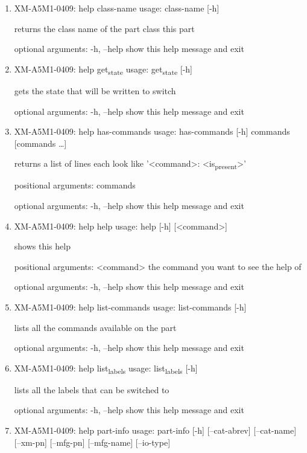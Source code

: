 \documentclass[11pt]{article}
\begin{document}
\begin{enumerate}
\item XM-A5M1-0409: help class-name
\label{sec:org9bf5bab}
usage: class-name [-h]

returns the class name of the part class this part

optional arguments:
  -h, --help  show this help message and exit

\item XM-A5M1-0409: help get\textsubscript{state}
\label{sec:org80c247e}
usage: get\textsubscript{state} [-h]

gets the state that will be written to switch

optional arguments:
  -h, --help  show this help message and exit

\item XM-A5M1-0409: help has-commands
\label{sec:org0997cf5}
usage: has-commands [-h] commands [commands \ldots{}]

returns a list of lines each look like '<command>: <is\textsubscript{present}>'

positional arguments:
  commands

optional arguments:
  -h, --help  show this help message and exit

\item XM-A5M1-0409: help help
\label{sec:org4e8efb1}
usage: help [-h] [<command>]

shows this help

positional arguments:
  <command>   the command you want to see the help of

optional arguments:
  -h, --help  show this help message and exit

\item XM-A5M1-0409: help list-commands
\label{sec:orgd54fe09}
usage: list-commands [-h]

lists all the commands available on the part

optional arguments:
  -h, --help  show this help message and exit

\item XM-A5M1-0409: help list\textsubscript{labels}
\label{sec:orgdcbf4ed}
usage: list\textsubscript{labels} [-h]

lists all the labels that can be switched to

optional arguments:
  -h, --help  show this help message and exit

\item XM-A5M1-0409: help part-info
\label{sec:org50a78a6}
usage: part-info  [-h] [--cat-abrev] [--cat-name] [--xm-pn] [--mfg-pn] [--mfg-name]
        [--io-type]


\end{enumerate}
\end{document}
